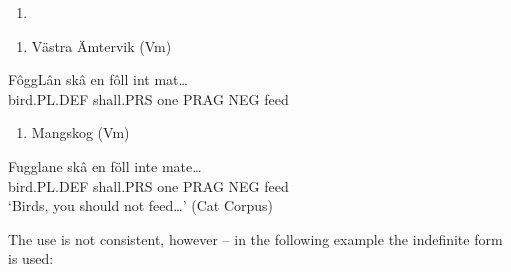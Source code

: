 \begin{enumerate} %
\item 
\end{enumerate} %
\setcounter{listLFOxcviiileveli}{0}
\begin{enumerate} %
\item 
Västra Ämtervik (Vm) 

\end{enumerate} %
FôggLân  skâ  en  fôll  int  mat…\\


bird.PL.DEF  shall.PRS  one  PRAG  NEG  feed\\ %


\begin{enumerate} %
\item 
Mangskog (Vm) 

\end{enumerate} %
Fugglane  skâ  en  föll  inte  mate…\\


bird.PL.DEF  shall.PRS  one  PRAG  NEG  feed\\ %


‘Birds, you should not feed…’ (Cat Corpus)
\z


The use is not consistent, however – in the following example the indefinite form is used:


